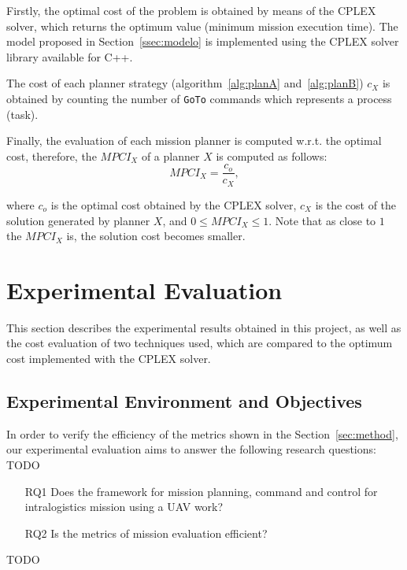 \documentclass[conference,harvard,brazil,english]{sbatex}
\begin{document}
Firstly, the optimal cost of the problem is obtained by means of the CPLEX solver, which returns the optimum value (minimum mission execution time). The model proposed in Section~\ref{ssec:modelo} is implemented using the CPLEX solver library available for C++. 

The cost of each planner strategy (algorithm~\ref{alg:planA} and~\ref{alg:planB}) $c_X$ is obtained by counting the number of \texttt{GoTo} commands which represents a process (task).

Finally, the evaluation of each mission planner is computed w.r.t. the optimal cost, therefore, the $MPCI_{X}$ of a planner $X$ is computed as follows:
%
\begin{equation}
\label{eq:MPCI}
	MPCI_X=\frac{c_o}{c_X},
\end{equation}

\noindent where $c_o$ is the optimal cost obtained by the CPLEX solver, \textbf{$c_X$} is the cost of the solution generated by planner $X$, and $0 \leq MPCI_X \leq 1$. Note that as close to $1$ the $MPCI_X$ is, the solution cost becomes smaller.

\section{Experimental Evaluation}
\label{sec:results}

This section describes the experimental results obtained in this project, as well as the cost evaluation of two techniques used, which are compared to the optimum cost implemented with the CPLEX solver.

\subsection{Experimental Environment and Objectives}
\label{ssec:expobjandenv}
In order to verify the efficiency of the metrics shown in the Section~\ref{sec:method}, our experimental evaluation aims to answer the following research questions:
TODO
\begin{enumerate}

\item[RQ1] Does the framework for mission planning, command and control for intralogistics mission using a UAV work?

\item[RQ2] Is the metrics of mission evaluation efficient?

\end{enumerate}
TODO
\end{document}
